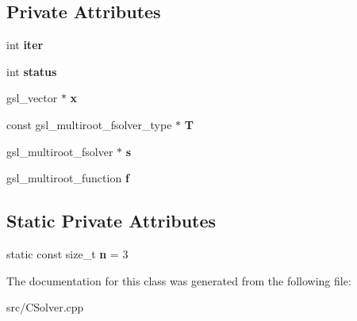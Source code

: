 \subsection*{Private Attributes}
\begin{DoxyCompactItemize}
\item 
\hypertarget{class_c_solver_ab3ac408ad4e53b86cf6567283b6a6ea3}{
int {\bfseries iter}}
\label{class_c_solver_ab3ac408ad4e53b86cf6567283b6a6ea3}

\item 
\hypertarget{class_c_solver_ab316e04d4b19c4dbafbd4bd2758dd494}{
int {\bfseries status}}
\label{class_c_solver_ab316e04d4b19c4dbafbd4bd2758dd494}

\item 
\hypertarget{class_c_solver_a0990da6fcc2bd8de29bbfc8506b0709b}{
gsl\_\-vector $\ast$ {\bfseries x}}
\label{class_c_solver_a0990da6fcc2bd8de29bbfc8506b0709b}

\item 
\hypertarget{class_c_solver_af72fa29afc3e909aea0009b3863db5ed}{
const gsl\_\-multiroot\_\-fsolver\_\-type $\ast$ {\bfseries T}}
\label{class_c_solver_af72fa29afc3e909aea0009b3863db5ed}

\item 
\hypertarget{class_c_solver_abe84a15c4dfb98dd21ef13b01f628f40}{
gsl\_\-multiroot\_\-fsolver $\ast$ {\bfseries s}}
\label{class_c_solver_abe84a15c4dfb98dd21ef13b01f628f40}

\item 
\hypertarget{class_c_solver_ab10fe4a3e8b6d5116dec3258364d1926}{
gsl\_\-multiroot\_\-function {\bfseries f}}
\label{class_c_solver_ab10fe4a3e8b6d5116dec3258364d1926}

\end{DoxyCompactItemize}
\subsection*{Static Private Attributes}
\begin{DoxyCompactItemize}
\item 
\hypertarget{class_c_solver_a5353e570e77452e26685f3a57df1ecd4}{
static const size\_\-t {\bfseries n} = 3}
\label{class_c_solver_a5353e570e77452e26685f3a57df1ecd4}

\end{DoxyCompactItemize}


The documentation for this class was generated from the following file:\begin{DoxyCompactItemize}
\item 
src/CSolver.cpp\end{DoxyCompactItemize}
